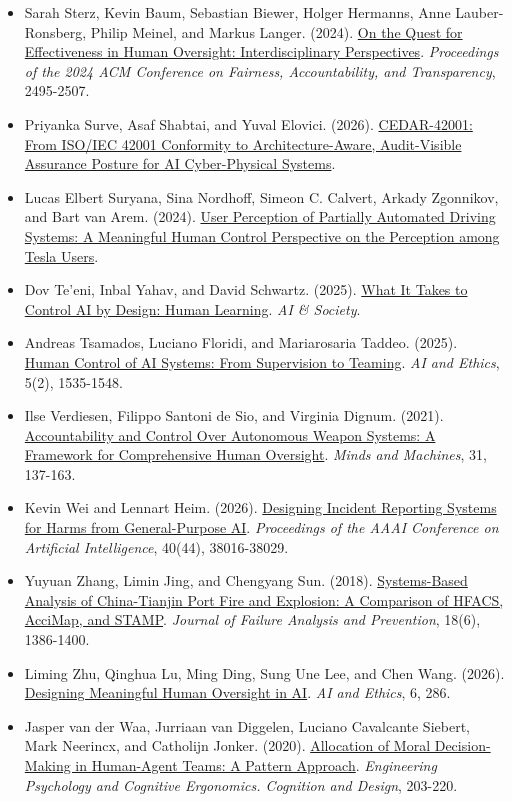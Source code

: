 \documentclass[11pt]{article}
\begin{document}
\begin{itemize}[leftmargin=*]
\item Sarah Sterz, Kevin Baum, Sebastian Biewer, Holger Hermanns, Anne Lauber-Ronsberg, Philip Meinel, and Markus Langer. (2024). \href{https://doi.org/10.1145/3630106.3659051}{On the Quest for Effectiveness in Human Oversight: Interdisciplinary Perspectives}. \emph{Proceedings of the 2024 ACM Conference on Fairness, Accountability, and Transparency}, 2495-2507.
\item Priyanka Surve, Asaf Shabtai, and Yuval Elovici. (2026). \href{https://doi.org/10.48550/arXiv.2606.21276}{CEDAR-42001: From ISO/IEC 42001 Conformity to Architecture-Aware, Audit-Visible Assurance Posture for AI Cyber-Physical Systems}.
\item Lucas Elbert Suryana, Sina Nordhoff, Simeon C. Calvert, Arkady Zgonnikov, and Bart van Arem. (2024). \href{https://doi.org/10.48550/arXiv.2402.08080}{User Perception of Partially Automated Driving Systems: A Meaningful Human Control Perspective on the Perception among Tesla Users}.
\item Dov Te'eni, Inbal Yahav, and David Schwartz. (2025). \href{https://doi.org/10.1007/s00146-025-02401-y}{What It Takes to Control AI by Design: Human Learning}. \emph{AI \& Society}.
\item Andreas Tsamados, Luciano Floridi, and Mariarosaria Taddeo. (2025). \href{https://doi.org/10.1007/s43681-024-00489-4}{Human Control of AI Systems: From Supervision to Teaming}. \emph{AI and Ethics}, 5(2), 1535-1548.
\item Ilse Verdiesen, Filippo Santoni de Sio, and Virginia Dignum. (2021). \href{https://doi.org/10.1007/s11023-020-09532-9}{Accountability and Control Over Autonomous Weapon Systems: A Framework for Comprehensive Human Oversight}. \emph{Minds and Machines}, 31, 137-163.
\item Kevin Wei and Lennart Heim. (2026). \href{https://doi.org/10.1609/aaai.v40i44.41139}{Designing Incident Reporting Systems for Harms from General-Purpose AI}. \emph{Proceedings of the AAAI Conference on Artificial Intelligence}, 40(44), 38016-38029.
\item Yuyuan Zhang, Limin Jing, and Chengyang Sun. (2018). \href{https://doi.org/10.1007/s11668-018-0534-1}{Systems-Based Analysis of China-Tianjin Port Fire and Explosion: A Comparison of HFACS, AcciMap, and STAMP}. \emph{Journal of Failure Analysis and Prevention}, 18(6), 1386-1400.
\item Liming Zhu, Qinghua Lu, Ming Ding, Sung Une Lee, and Chen Wang. (2026). \href{https://doi.org/10.1007/s43681-026-01147-7}{Designing Meaningful Human Oversight in AI}. \emph{AI and Ethics}, 6, 286.
\item Jasper van der Waa, Jurriaan van Diggelen, Luciano Cavalcante Siebert, Mark Neerincx, and Catholijn Jonker. (2020). \href{https://doi.org/10.1007/978-3-030-49183-3_16}{Allocation of Moral Decision-Making in Human-Agent Teams: A Pattern Approach}. \emph{Engineering Psychology and Cognitive Ergonomics. Cognition and Design}, 203-220.
\end{itemize}
\FloatBarrier
\end{document}
